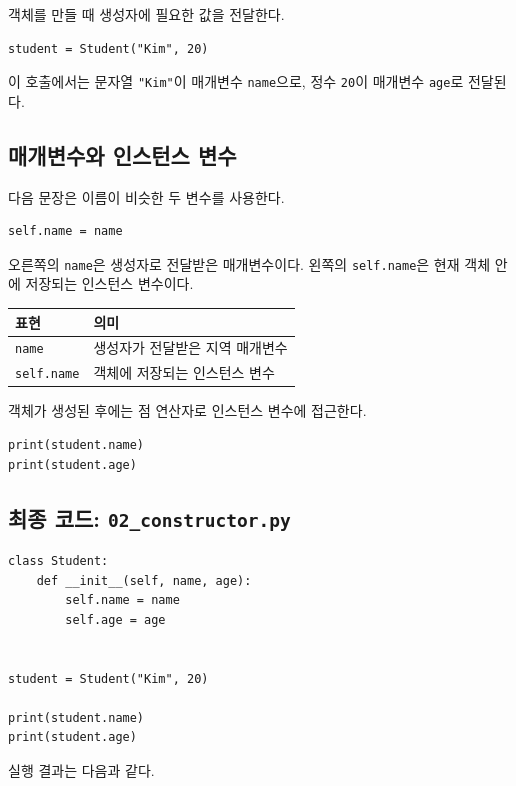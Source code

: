 \documentclass[11pt,a4paper]{article}
\begin{document}
객체를 만들 때 생성자에 필요한 값을 전달한다.

\begin{lstlisting}
student = Student("Kim", 20)
\end{lstlisting}

이 호출에서는 문자열 \texttt{"Kim"}이 매개변수 \texttt{name}으로, 정수 \texttt{20}이 매개변수 \texttt{age}로 전달된다.

\subsection{매개변수와 인스턴스 변수}

다음 문장은 이름이 비슷한 두 변수를 사용한다.

\begin{lstlisting}
self.name = name
\end{lstlisting}

오른쪽의 \texttt{name}은 생성자로 전달받은 매개변수이다. 왼쪽의 \texttt{self.name}은 현재 객체 안에 저장되는 인스턴스 변수이다.

\begin{center}
\begin{tabular}{ll}
\toprule
표현 & 의미 \\
\midrule
\texttt{name} & 생성자가 전달받은 지역 매개변수 \\
\texttt{self.name} & 객체에 저장되는 인스턴스 변수 \\
\bottomrule
\end{tabular}
\end{center}

객체가 생성된 후에는 점 연산자로 인스턴스 변수에 접근한다.

\begin{lstlisting}
print(student.name)
print(student.age)
\end{lstlisting}

\subsection{최종 코드: \texttt{02\_constructor.py}}

\begin{lstlisting}
class Student:
    def __init__(self, name, age):
        self.name = name
        self.age = age


student = Student("Kim", 20)

print(student.name)
print(student.age)
\end{lstlisting}

실행 결과는 다음과 같다.
\end{document}

